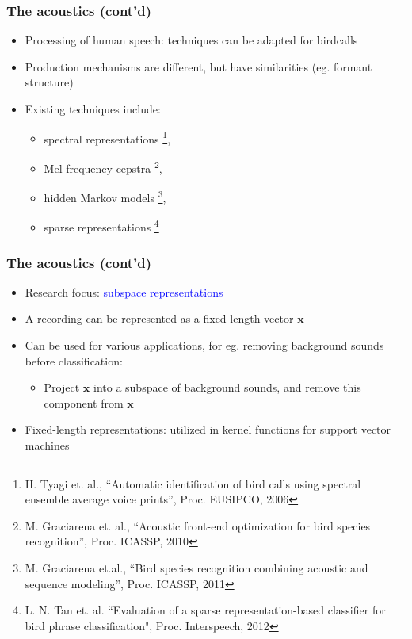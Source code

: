 \documentclass[mathserif]{beamer}
\begin{document}
\begin{frame}
\frametitle{The acoustics (cont'd)}
\begin{itemize}
\item<2-> Processing of human speech: techniques can be adapted for birdcalls
\item<3-> Production mechanisms are different, but have similarities (eg. formant
structure)
\item<4-> Existing techniques include:
\begin{itemize}
	\item spectral representations \footnote{
	H. Tyagi et. al., ``Automatic identification of bird calls using spectral 
	ensemble average voice prints'', Proc. EUSIPCO, 2006},
	\item Mel frequency cepstra \footnote{M. Graciarena et. al., 
	``Acoustic front-end optimization for bird species recognition'', 
	Proc. ICASSP, 2010}, 
	\item hidden Markov models \footnote{M. Graciarena et.al., 
	``Bird species recognition combining acoustic and sequence modeling'', 
	Proc. ICASSP, 2011}, 
	\item sparse representations \footnote{L. N. Tan et. al. 
	``Evaluation of a sparse representation-based classifier for bird phrase 
	classification", Proc. Interspeech, 2012}
\end{itemize}
\end{itemize}
\end{frame}


\begin{frame}
\frametitle{The acoustics (cont'd)}
\begin{itemize}
\item<2-> Research focus: \textcolor{blue}{subspace representations} 
\item<3-> A recording can be represented as a fixed-length vector $\mathbf{x}$ 
\item<4-> Can be used for various applications, for eg. removing background
sounds before classification:
\begin{itemize}
	\item<5-> Project $\mathbf{x}$ into a subspace of background sounds, and remove this
	component from $\mathbf{x}$
\end{itemize}
\item <6-> Fixed-length representations: utilized in kernel functions for
support vector machines
\end{itemize}
\end{frame}
\end{document}
